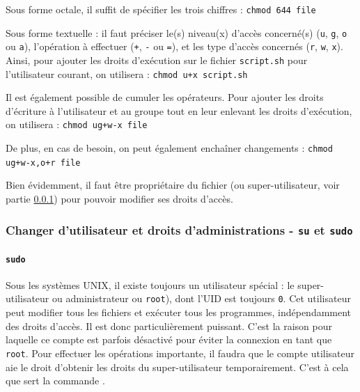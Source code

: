 Sous forme octale, il suffit de spécifier les trois chiffres : \texttt{chmod 644 file}
 
Sous forme textuelle : il faut préciser le(s) niveau(x) d'accès concerné(s) (\texttt{u}, \texttt{g}, \texttt{o} ou \texttt{a}), l'opération à effectuer (\texttt{+}, \texttt{-} ou \texttt{=}), et les type d'accès concernés (\texttt{r}, \texttt{w}, \texttt{x}). Ainsi, pour ajouter les droits d'exécution sur le fichier \texttt{script.sh} pour l'utilisateur courant, on utilisera : \texttt{chmod u+x script.sh}

Il est également possible de cumuler les opérateurs. Pour ajouter les droits d'écriture à l'utilisateur et au groupe tout en leur enlevant les droits d'exécution, on utilisera : \texttt{chmod ug+w-x file}

De plus, en cas de besoin, on peut également enchaîner changements : \texttt{chmod ug+w-x,o+r file}

 Bien évidemment, il faut être propriétaire du fichier (ou super-utilisateur, voir partie \ref{sec:su}) pour pouvoir modifier ses droits d'accès.

\newpage
\subsubsection{Changer d'utilisateur et droits d'administrations - \texttt{su} et \texttt{sudo}} \label{sec:su}

\paragraph{\texttt{sudo}} 

Sous les systèmes UNIX, il existe toujours un utilisateur spécial : le super-utilisateur ou administrateur ou \texttt{root}), dont l'UID est toujours \texttt{0}. Cet utilisateur peut modifier tous les fichiers et exécuter tous les programmes, indépendamment des droits d'accès. Il est donc particulièrement puissant. C'est la raison pour laquelle ce compte est parfois désactivé pour éviter la connexion en tant que \texttt{root}. Pour effectuer les opérations importante, il faudra que le compte utilisateur aie le droit d'obtenir les droits du super-utilisateur temporairement. C'est à cela que sert la commande .
\vspace{1em}

\begin{boxed}
\begin{nscenter}
\vspace{-1em}%
\end{nscenter}
\end{boxed}

